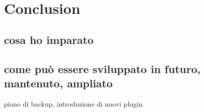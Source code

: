 \chapter{Conclusion}
\label{conclusion}

\section{cosa ho imparato}
\section{come può essere sviluppato in futuro, mantenuto, ampliato}
piano di backup, introduzione di nuovi plugin
